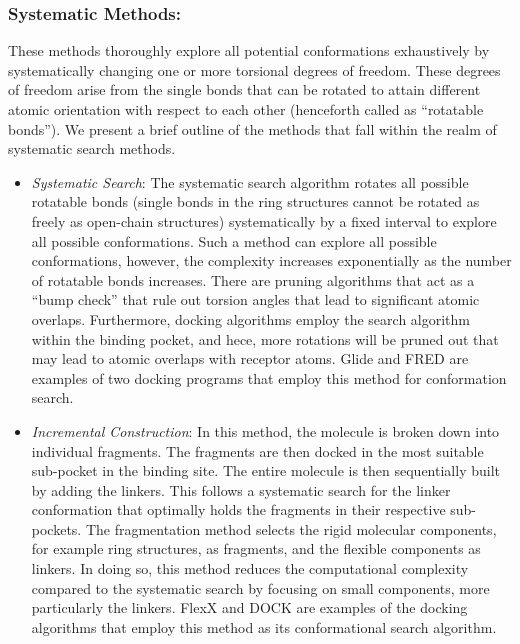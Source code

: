 \documentclass[10pt, a4paper]{book}
\begin{document}
\subsubsection*{Systematic Methods:}
These methods thoroughly explore all potential conformations exhaustively by systematically changing one or more torsional degrees of freedom. These degrees of freedom arise from the single bonds that can be rotated to attain different atomic orientation with respect to each other (henceforth called as “rotatable bonds”).  We present a brief outline of the methods that fall within the realm of systematic search methods.  
\begin{itemize}
    \item \textit{Systematic Search}: The systematic search algorithm\cite{bib14} rotates all possible rotatable bonds (single bonds in the ring structures cannot be rotated as freely as open-chain structures) systematically by a fixed interval to explore all possible conformations. Such a method can explore all possible conformations, however, the complexity increases exponentially as the number of rotatable bonds increases. There are pruning algorithms that act as a “bump check” that rule out torsion angles that lead to significant atomic overlaps. Furthermore, docking algorithms employ the search algorithm within the binding pocket, and hece, more rotations will be pruned out that 
    may lead to atomic overlaps with receptor atoms. Glide\cite{bib15} and FRED\cite{bib16} are examples of two docking programs that employ this method for conformation search. 

    \item \textit{Incremental Construction}: In this method\cite{bib17}, the molecule is broken down into individual fragments. The fragments are then docked in the most suitable sub-pocket in the binding site. The entire molecule is then sequentially built by adding the linkers. This follows a systematic search for the linker conformation that optimally holds the fragments in their respective sub-pockets. The fragmentation method selects the rigid molecular components, for example ring structures, as fragments, and the flexible components as linkers. In doing so, this method reduces the computational complexity compared to the systematic search by focusing on small components, more particularly the linkers. FlexX\cite{bib19} and DOCK\cite{bib18} are examples of the docking algorithms that employ this method as its conformational search algorithm.
\end{itemize}
\end{document}
